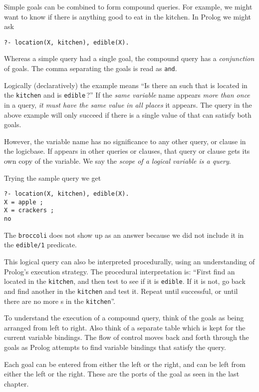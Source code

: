 \label{adv4}\secdown

Simple goals can be combined to form compound queries. For example, we might
want to know if there is anything good to eat in the kitchen. In Prolog we might
ask
\begin{verbatim}
?- location(X, kitchen), edible(X).
\end{verbatim}
Whereas a simple query had a single goal, the compound query has a
\emph{conjunction} of goals. The comma separating the goals is read as
\verb|and|.

Logically (declaratively) the example means ``Is there an  such that
 is located in the \verb|kitchen| and  is \verb|edible|\,?'' If
the \emph{same variable} name appears \emph{more than once} in a query,
\emph{it must have the same value in all places} it appears. The query in the
above example will only succeed if there is a single value of  that can
satisfy both goals.

However, the variable name has no significance to any other query, or clause in
the logicbase. If  appears in other queries or clauses, that query or
clause gets its own copy of the variable. We say the \emph{scope of a logical
variable is a query}.

Trying the sample query we get
\begin{verbatim}
?- location(X, kitchen), edible(X).
X = apple ;
X = crackers ;
no
\end{verbatim}
The \verb'broccoli' does not show up as an answer because we did not include it
in the \verb|edible/1| predicate.

This logical query can also be interpreted procedurally, using an understanding
of Prolog's execution strategy. The procedural interpretation is: ``First find
an  located in the \verb|kitchen|, and then test to see if it is
\verb|edible|. If it is not, go back and find another  in the
\verb|kitchen| and test it. Repeat until successful, or until there are no more
s in the \verb|kitchen|''.

To understand the execution of a compound query, think of the goals as being
arranged from left to right. Also think of a separate table which is kept for
the current variable bindings. The flow of control moves back and forth through
the goals as Prolog attempts to find variable bindings that satisfy the query.

Each goal can be entered from either the left or the right, and can be left from
either the left or the right. These are the ports of the goal as seen in the
last chapter.

